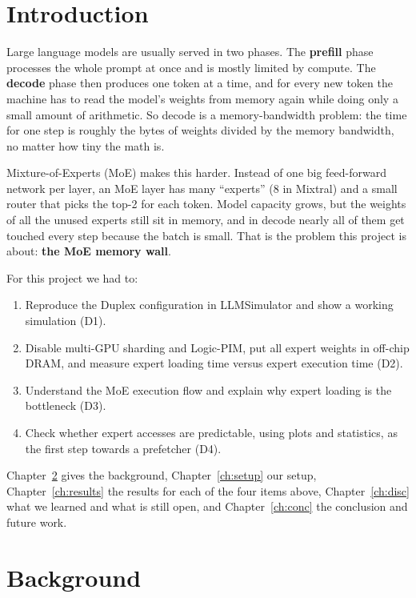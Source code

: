 \documentclass[11pt,a4paper]{report}
\begin{document}
\clearpage

\tableofcontents

\clearpage
{}

\chapter{Introduction}

Large language models are usually served in two phases. The \textbf{prefill} phase processes the whole prompt at once and is mostly limited by compute. The \textbf{decode} phase then produces one token at a time, and for every new token the machine has to read the model's weights from memory again while doing only a small amount of arithmetic. So decode is a memory-bandwidth problem: the time for one step is roughly the bytes of weights divided by the memory bandwidth, no matter how tiny the math is.

Mixture-of-Experts (MoE) makes this harder. Instead of one big feed-forward network per layer, an MoE layer has many ``experts'' (8 in Mixtral) and a small router that picks the top-2 for each token. Model capacity grows, but the weights of all the unused experts still sit in memory, and in decode nearly all of them get touched every step because the batch is small. That is the problem this project is about: \textbf{the MoE memory wall}.

For this project we had to:
\begin{enumerate}
\item Reproduce the Duplex configuration in LLMSimulator and show a working simulation (D1).
\item Disable multi-GPU sharding and Logic-PIM, put all expert weights in off-chip DRAM, and measure expert loading time versus expert execution time (D2).
\item Understand the MoE execution flow and explain why expert loading is the bottleneck (D3).
\item Check whether expert accesses are predictable, using plots and statistics, as the first step towards a prefetcher (D4).
\end{enumerate}

Chapter~\ref{ch:bg} gives the background, Chapter~\ref{ch:setup} our setup, Chapter~\ref{ch:results} the results for each of the four items above, Chapter~\ref{ch:disc} what we learned and what is still open, and Chapter~\ref{ch:conc} the conclusion and future work.

\chapter{Background}
\label{ch:bg}
\end{document}
